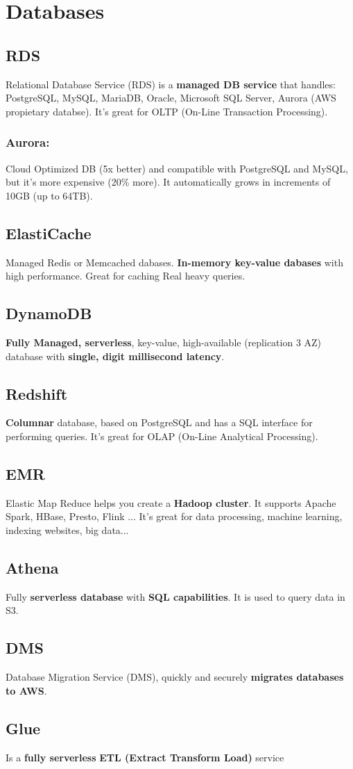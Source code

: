 \section{Databases}

\subsection{RDS}
Relational Database Service (RDS) is a \textbf{managed DB service} that handles: PostgreSQL, MySQL, MariaDB, Oracle, Microsoft SQL Server, Aurora (AWS propietary databse). It's great for OLTP (On-Line Transaction Processing).

\subsubsection{Aurora:}
Cloud Optimized DB (5x better) and compatible with PostgreSQL and MySQL, but it's more expensive (20\% more). It automatically grows in increments of 10GB (up to 64TB).

\subsection{ElastiCache}
Managed Redis or Memcached dabases. \textbf{In-memory key-value dabases} with high performance. Great for caching Real heavy queries.

\subsection{DynamoDB}
\textbf{Fully Managed, serverless}, key-value, high-available (replication 3 AZ) database with \textbf{single, digit millisecond latency}.

\subsection{Redshift}
\textbf{Columnar} database, based on PostgreSQL and has a SQL interface for performing queries. It's great for  OLAP (On-Line Analytical Processing).

\subsection{EMR}
Elastic Map Reduce helps you create a \textbf{Hadoop cluster}. It supports Apache Spark, HBase, Presto, Flink ... It's great for data processing, machine learning, indexing websites, big data...

\subsection{Athena}
Fully \textbf{serverless database} with \textbf{SQL capabilities}. It is used to query data in S3.

\subsection{DMS}
Database Migration Service (DMS), quickly and securely \textbf{migrates databases to AWS}.

\subsection{Glue}
Is a \textbf{fully serverless} \textbf{ETL (Extract Transform Load)} service